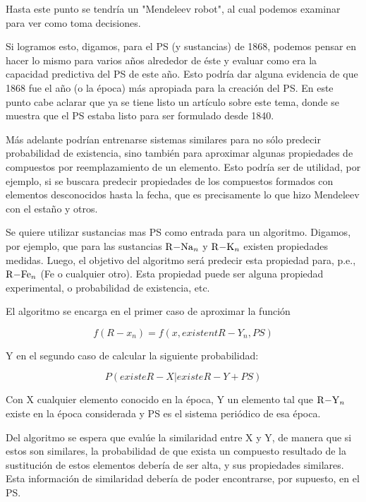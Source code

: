 \documentclass[twoside,twocolumn]{article}
\begin{document}
Hasta este punto se tendr\'ia un "Mendeleev robot", al cual podemos examinar para ver como toma decisiones.

Si logramos esto, digamos, para el PS (y sustancias) de 1868, podemos pensar en hacer lo mismo para varios a\~nos alrededor de \'este y evaluar como era la capacidad predictiva del PS de este a\~no. Esto podr\'ia dar alguna evidencia de que 1868 fue el a\~no (o la \'epoca) m\'as apropiada para la creaci\'on del PS. En este punto cabe aclarar que ya se tiene listo un art\'iculo sobre este tema, donde se muestra que el PS estaba listo para ser formulado desde 1840.

M\'as adelante podr\'ian entrenarse sistemas similares para no s\'olo predecir probabilidad de existencia, sino tambi\'en para aproximar algunas propiedades de compuestos por reemplazamiento de un elemento. Esto podr\'ia ser de utilidad, por ejemplo, si se buscara predecir propiedades de los compuestos formados con elementos desconocidos hasta la fecha, que es precisamente lo que hizo Mendeleev con el esta\~no y otros. 

Se quiere utilizar sustancias mas PS como entrada para un algoritmo. Digamos, por ejemplo, que para las sustancias $\ce{R-Na_n}$ y $\ce{R-K_n}$ existen propiedades medidas. Luego, el objetivo del algoritmo ser\'a predecir esta propiedad para, p.e., $\ce{R-Fe_n}$ (Fe o cualquier otro). Esta propiedad puede ser alguna propiedad experimental, o probabilidad de existencia, etc.

El algoritmo se encarga en el primer caso de aproximar la funci\'on

\begin{equation}
\label{eq:eq1}
 f(R-x_n) = f( x, existent R-Y_n , PS )
\end{equation}

Y en el segundo caso de calcular la siguiente probabilidad:

\begin{equation}
\label{eq:eq2}
P ( existe R-X |  existe R-Y  + PS )
\end{equation}

Con X cualquier elemento conocido en la \'epoca, Y un elemento tal que $\ce{R-Y_n}$ existe en la \'epoca considerada y PS es el sistema peri\'odico de esa \'epoca.

Del algoritmo se espera que eval\'ue la similaridad entre X y Y, de manera que si estos son similares, la probabilidad de que exista un compuesto resultado de la sustituci\'on de estos elementos deber\'ia de ser alta, y sus propiedades similares. Esta informaci\'on de similaridad deber\'ia de poder encontrarse, por supuesto, en el PS. 
\end{document}
